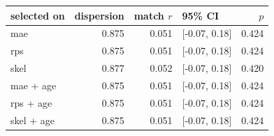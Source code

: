 
\begin{tabular}{lrrlr}
\toprule
selected on & dispersion & match $r$ & 95\% CI & $p$\\
\midrule
mae & 0.875 & 0.051 & {}[-0.07, 0.18] & 0.424\\
rps & 0.875 & 0.051 & {}[-0.07, 0.18] & 0.424\\
skel & 0.877 & 0.052 & {}[-0.07, 0.18] & 0.420\\
mae + age & 0.875 & 0.051 & {}[-0.07, 0.18] & 0.424\\
rps + age & 0.875 & 0.051 & {}[-0.07, 0.18] & 0.424\\
skel + age & 0.875 & 0.051 & {}[-0.07, 0.18] & 0.424\\
\bottomrule
\end{tabular}
